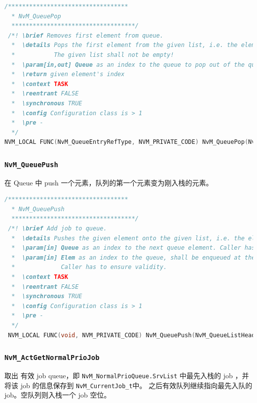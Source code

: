 \begin{lstlisting}[language=C,style=C]
  /**********************************
  * NvM_QueuePop
  ***********************************/
 /*! \brief Removes first element from queue.
  *  \details Pops the first element from the given list, i.e. the element is removed from the list and will be returned.
  *           The given list shall not be empty!
  *  \param[in,out] Queue as an index to the queue to pop out of the queue. Caller has to ensure validity.
  *  \return given element's index
  *  \context TASK
  *  \reentrant FALSE
  *  \synchronous TRUE
  *  \config Configuration class is > 1
  *  \pre -
  */
NVM_LOCAL FUNC(NvM_QueueEntryRefType, NVM_PRIVATE_CODE) NvM_QueuePop(NvM_QueueListHeadRefType Queue);
\end{lstlisting}

\subsubsection{\lstinline{NvM_QueuePush}}
在 Queue 中 push 一个元素，队列的第一个元素变为刚入栈的元素。

\begin{lstlisting}[language=C,style=C]
  /**********************************
  * NvM_QueuePush
  ***********************************/
 /*! \brief Add job to queue.
  *  \details Pushes the given element onto the given list, i.e. the element is inserted at list head.
  *  \param[in] Queue as an index to the next queue element. Caller has to ensure validity.
  *  \param[in] Elem as an index to the queue, shall be enqueued at the end of the linked list.
  *             Caller has to ensure validity.
  *  \context TASK
  *  \reentrant FALSE
  *  \synchronous TRUE
  *  \config Configuration class is > 1
  *  \pre -
  */
 NVM_LOCAL FUNC(void, NVM_PRIVATE_CODE) NvM_QueuePush(NvM_QueueListHeadRefType Queue, NvM_QueueEntryRefType Elem);
\end{lstlisting}

\subsubsection{\lstinline{NvM_ActGetNormalPrioJob}}
取出 有效 job queue，即 \lstinline{NvM_NormalPrioQueue.SrvList} 中最先入栈的 job ，并将该 job 的信息保存到 \lstinline{NvM_CurrentJob_t}中。
之后有效队列继续指向最先入队的 job。空队列则入栈一个 job 空位。

